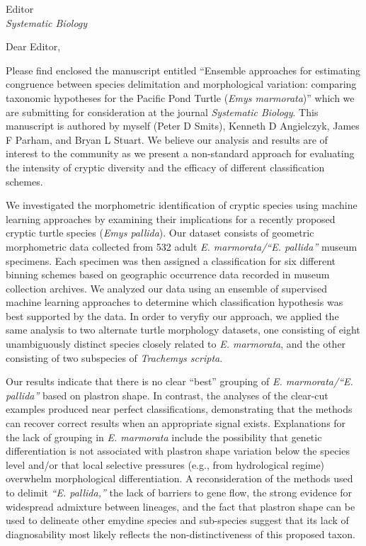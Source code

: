 \documentclass{letter}
\begin{document}
\begin{letter}{Editor \\ \textit{Systematic Biology}}
  \opening{Dear Editor,}

  Please find enclosed the manuscript entitled ``Ensemble approaches for estimating congruence between species delimitation and morphological variation: comparing taxonomic hypotheses for the Pacific Pond Turtle (\textit{Emys marmorata})'' which we are submitting for consideration at the journal \textit{Systematic Biology}. This manuscript is authored by myself (Peter D Smits), Kenneth D Angielczyk, James F Parham, and Bryan L Stuart. We believe our analysis and results are of interest to the community as we present a non-standard approach for evaluating the intensity of cryptic diversity and the efficacy of different classification schemes.

  We investigated the morphometric identification of cryptic species using machine learning approaches by examining their implications for a recently proposed cryptic turtle species (\textit{Emys pallida}). Our dataset consists of geometric morphometric data collected from  532 adult \textit{E. marmorata/``E. pallida''} museum specimens. Each specimen was then assigned a classification for six different binning schemes based on geographic occurrence data recorded in museum collection archives. We analyzed our data using an ensemble of supervised machine learning approaches to determine which classification hypothesis was best supported by the data. In order to veryfiy our approach, we applied the same analysis to two alternate turtle morphology datasets, one consisting of eight unambiguously distinct species closely related to \textit{E. marmorata}, and the other consisting of two subspecies of \textit{Trachemys scripta}. 
  
  Our results indicate that there is no clear ``best'' grouping of \textit{E. marmorata/``E. pallida''} based on plastron shape. In contrast, the analyses of the clear-cut examples produced near perfect classifications, demonstrating that the methods can recover correct results when an appropriate signal exists. Explanations for the lack of grouping in \textit{E. marmorata} include the possibility that genetic differentiation is not associated with plastron shape variation below the species level and/or that local selective pressures (e.g., from hydrological regime) overwhelm morphological differentiation. A reconsideration of the methods used to delimit \textit{``E. pallida,''} the lack of barriers to gene flow, the strong evidence for widespread admixture between lineages, and the fact that plastron shape can be used to delineate other emydine species and sub-species suggest that its lack of diagnosability most likely reflects the non-distinctiveness of this proposed taxon. 


\end{letter}
\end{document}
